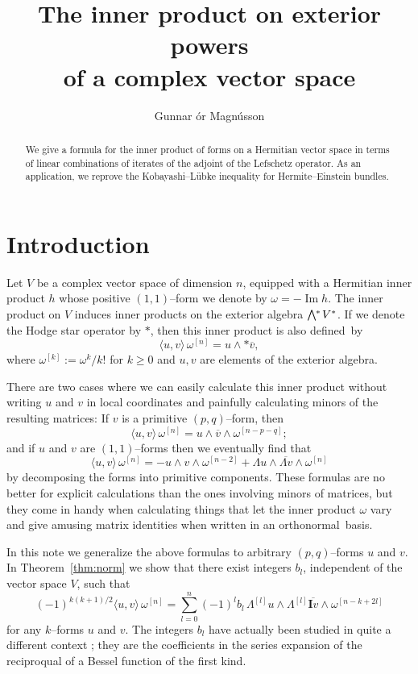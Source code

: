\documentclass[11pt,a4paper]{amsart}
\title[The inner product of complex forms]
{The inner product on exterior powers\\ of a complex vector space}
\author{Gunnar \TH\'{o}r Magn\'{u}sson}
\def\^#1{^{[#1]}}
\def\bw#1{\bigwedge{}^{\mkern-5mu #1}\mkern2mu}
\def\I{\mathbf{I}}
\theoremstyle{definition}
\theoremstyle{remark}
\numberwithin{equation}{section}
\begin{document}
\begin{abstract}
We give a formula for the inner product of forms on a Hermitian vector
space in terms of linear combinations of iterates of the adjoint of the
Lefschetz operator.  As an application, we reprove the
Kobayashi--L\"{u}bke inequality for Hermite--Einstein bundles. 
\end{abstract}


\maketitle 



\section*{Introduction}


Let $V$ be a complex vector space of dimension $n$, equipped with a
Hermitian inner product $h$ whose positive $(1,1)$--form we denote by
$\omega = -\operatorname{Im} h$. The inner product on $V$ induces inner
products on the exterior algebra $\bw{*} V^*$. If we denote the Hodge star
operator by $*$, then this inner product is also defined~by%
$$
\langle u, v\rangle \, \omega\^n 
= u \wedge *\overline v,
$$ 
where $\omega\^k := \omega^k / k!$ for $k \geq 0$ and $u,v$ are elements
of the exterior algebra.

There are two cases where we can easily calculate this inner product
without writing $u$ and $v$ in local coordinates and painfully calculating
minors of the resulting matrices: If $v$ is a primitive
$(p,q)$--form, then
$$
\langle u, v\rangle \, \omega\^n 
= u \wedge \overline v \wedge \omega\^{n-p-q};
$$ 
and if $u$ and $v$ are $(1,1)$--forms then we eventually find that
$$
\langle u, v\rangle \, \omega\^n 
= - u \wedge v \wedge \omega\^{n-2}
+\Lambda u \wedge \overline{\Lambda v} \wedge \omega\^{n}
$$
by decomposing the forms into primitive components. These formulas are 
no better for explicit calculations than the ones involving minors of
matrices, but they come in handy when calculating things that let the
inner product $\omega$ vary and give amusing matrix identities when
written in an orthonormal~basis.%

In this note we generalize the above formulas to arbitrary $(p,q)$--forms
$u$ and $v$. In Theorem~\ref{thm:norm} we show that there exist integers
$b_l$, independent of the vector space $V$, such that
$$
    (-1)^{k(k+1)/2}
    \langle u, v \rangle \, \omega\^n
    = \sum_{l=0}^n (-1)^{l} b_l \, 
    \Lambda\^l u \wedge \Lambda\^l \overline{\I v}
    \wedge \omega\^{n-k+2l}
$$
for any $k$--forms $u$ and $v$. The integers $b_l$ have actually been
studied in quite a different context \cite{Carlitz,Riordan,OEIS}; they are
the coefficients in the series expansion of the reciproqual of a Bessel
function of the first kind. 
\end{document}
